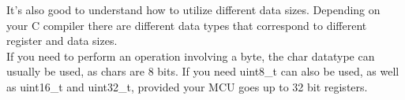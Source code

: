 \documentclass[10pt]{article}
\begin{document}
It's also good to understand how to utilize different data sizes. Depending on your C compiler there are different data types that correspond to different register and data sizes. \\

If you need to perform an operation involving a byte, the char datatype can usually be used, as chars are 8 bits. If you need uint8\_t can also be used, as well as uint16\_t and uint32\_t, provided your MCU goes up to 32 bit registers.
\end{document}
